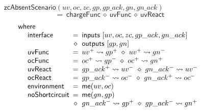 \documentclass[british, journal]{IEEEtran}
\begin{document}
\vspace{-4mm}
\[
\mathsf{zcAbsentScenario}(uv,oc,zc,gp,gp\_ack,gn,gn\_ack)~~~~~~~~~~~~~~~~~~~~~~~~~~~~~~~
\]
\vspace{-6mm}
\[
~~=~\mathsf{chargeFunc}~\diamond~\mathsf{uvFunc}~\diamond~\mathsf{uvReact}
\]
\vspace{-5mm}
\[
\begin{array}{lcl}
\mathsf{where}&~&\\

~~~~\mathsf{interface}&\hspace{-2mm}=&\hspace{-2mm}\mathsf{inputs}~[uv, oc, zc,
gp\_ack, gn\_ack]\\
~&\hspace{-2mm}\diamond&\hspace{-2mm}\mathsf{outputs}~[gp, gn]\\

~~~~\mathsf{uvFunc}&\hspace{-2mm}=&\hspace{-2mm}uv^{+}\rightsquigarrow
gp^{+}~\diamond~ uv^{+}\rightsquigarrow gn^{-}\\

~~~~\mathsf{ocFunc}&\hspace{-2mm}=&\hspace{-2mm}oc^{+}\rightsquigarrow
gp^{-}~\diamond~ oc^{+}\rightsquigarrow gn^{+}\\

~~~~\mathsf{uvReact}&\hspace{-2mm}=&\hspace{-2mm}gp\_ack^{+}\rightsquigarrow
uv^{-}~\diamond~gn\_ack^{-}\rightsquigarrow uv^{-}\\

~~~~\mathsf{ocReact}&\hspace{-2mm}=&\hspace{-2mm}gp\_ack^{-}\rightsquigarrow
oc^{-}~\diamond~gn\_ack^{+}\rightsquigarrow oc^{-}\\

~~~~\mathsf{environment}&\hspace{-2mm}=&\hspace{-2mm}\mathsf{me}(uv, oc)\\

~~~~\mathsf{\mathsf{noShortcircuit}}&\hspace{-2mm}=&\hspace{-2mm}\mathsf{me}(gn,
gp)\\
~&\hspace{-2mm}\diamond&\hspace{-2mm}gn\_ack^{-}\rightsquigarrow
gp^{+}~\diamond~gp\_ack^{-}\rightsquigarrow gn^{+}\\


\end{array}\]
\end{document}
